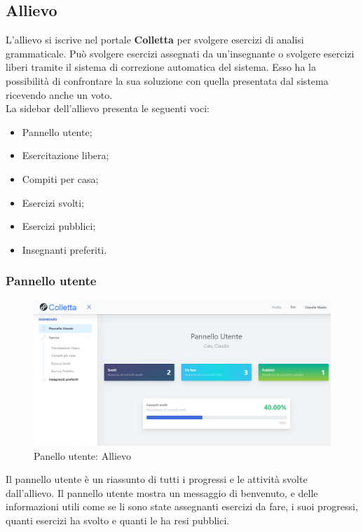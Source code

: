     \subsection{Allievo}
      L'allievo si iscrive nel portale \textbf{Colletta} per svolgere esercizi di analisi grammaticale. Può svolgere esercizi assegnati da un'insegnante o svolgere esercizi liberi tramite il sistema di correzione automatica del sistema. Esso ha la possibilità di confrontare la sua soluzione con quella presentata dal sistema ricevendo anche un voto.
      \\La sidebar dell'allievo presenta le seguenti voci:
            \begin{itemize}
                \item Pannello utente;
                \item Esercitazione libera;
                \item Compiti per casa;
                \item Esercizi svolti;
                \item Esercizi pubblici;
                \item Insegnanti preferiti.
            \end{itemize}
            

            
        \subsubsection{Pannello utente}
			\begin{figure}[H]
        		\centering
        		\includegraphics[width=1\linewidth]{sez/img/studente/panelloUtente.PNG} 
        		\caption{Panello utente: Allievo}\label{fig:1}
    		\end{figure}        
        
          Il pannello utente è un riassunto di tutti i progressi e le attività svolte dall'allievo. Il pannello utente mostra un messaggio di benvenuto, e delle informazioni utili come se li sono state assegnanti esercizi da fare, i suoi progressi, quanti esercizi ha svolto e quanti le ha resi pubblici. 
          
